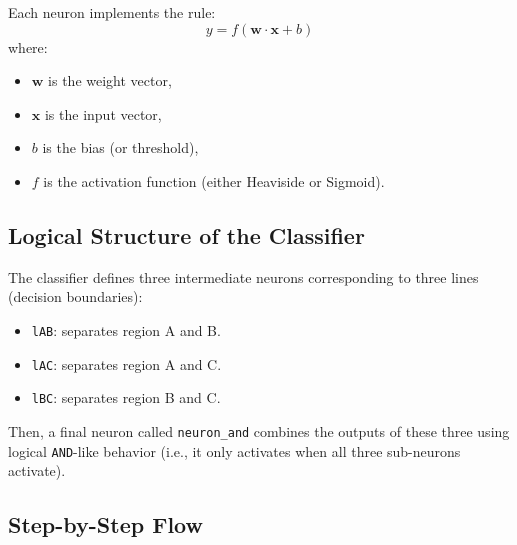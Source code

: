 \documentclass{article}
\begin{document}
Each neuron implements the rule:
\[
y = f(\mathbf{w} \cdot \mathbf{x} + b)
\]
where:
\begin{itemize}
    \item $\mathbf{w}$ is the weight vector,
    \item $\mathbf{x}$ is the input vector,
    \item $b$ is the bias (or threshold),
    \item $f$ is the activation function (either Heaviside or Sigmoid).
\end{itemize}

\subsection*{Logical Structure of the Classifier}

The classifier defines three intermediate neurons corresponding to three lines (decision boundaries):
\begin{itemize}
    \item \texttt{lAB}: separates region A and B.
    \item \texttt{lAC}: separates region A and C.
    \item \texttt{lBC}: separates region B and C.
\end{itemize}

Then, a final neuron called \texttt{neuron\_and} combines the outputs of these three using logical \texttt{AND}-like behavior (i.e., it only activates when all three sub-neurons activate).

\subsection*{Step-by-Step Flow}
\end{document}
